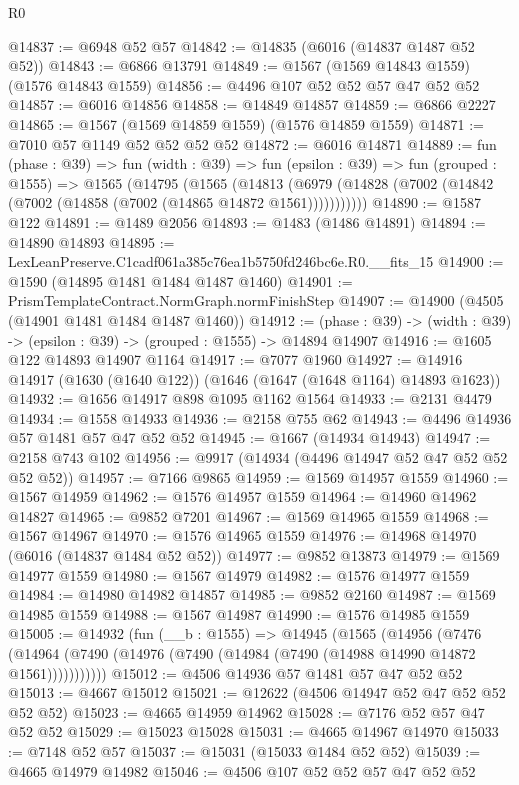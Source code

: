 \begin{lexlean}{R0}
\begin{coremodule}
@14837 := @6948 @52 @57
@14842 := @14835 (@6016 (@14837 @1487 @52 @52))
@14843 := @6866 @13791
@14849 := @1567 (@1569 @14843 @1559) (@1576 @14843 @1559)
@14856 := @4496 @107 @52 @52 @57 @47 @52 @52
@14857 := @6016 @14856
@14858 := @14849 @14857
@14859 := @6866 @2227
@14865 := @1567 (@1569 @14859 @1559) (@1576 @14859 @1559)
@14871 := @7010 @57 @1149 @52 @52 @52 @52
@14872 := @6016 @14871
@14889 := fun (phase : @39) =>
  fun (width : @39) =>
  fun (epsilon : @39) =>
  fun (grouped : @1555) =>
  @1565
    (@14795
      (@1565
        (@14813 (@6979 (@14828 (@7002 (@14842 (@7002 (@14858 (@7002 (@14865 @14872 @1561)))))))))))
@14890 := @1587 @122
@14891 := @1489 @2056
@14893 := @1483 (@1486 @14891)
@14894 := @14890 @14893
@14895 := LexLeanPreserve.C1cadf061a385c76ea1b5750fd246bc6e.R0.__fits_15
@14900 := @1590 (@14895 @1481 @1484 @1487 @1460)
@14901 := PrismTemplateContract.NormGraph.normFinishStep
@14907 := @14900 (@4505 (@14901 @1481 @1484 @1487 @1460))
@14912 := (phase : @39) -> (width : @39) -> (epsilon : @39) -> (grouped : @1555) -> @14894 @14907
@14916 := @1605 @122 @14893 @14907 @1164
@14917 := @7077 @1960
@14927 := @14916 @14917 (@1630 (@1640 @122)) (@1646 (@1647 (@1648 @1164) @14893 @1623))
@14932 := @1656 @14917 @898 @1095 @1162 @1564
@14933 := @2131 @4479
@14934 := @1558 @14933
@14936 := @2158 @755 @62
@14943 := @4496 @14936 @57 @1481 @57 @47 @52 @52
@14945 := @1667 (@14934 @14943)
@14947 := @2158 @743 @102
@14956 := @9917 (@14934 (@4496 @14947 @52 @47 @52 @52 @52 @52))
@14957 := @7166 @9865
@14959 := @1569 @14957 @1559
@14960 := @1567 @14959
@14962 := @1576 @14957 @1559
@14964 := @14960 @14962 @14827
@14965 := @9852 @7201
@14967 := @1569 @14965 @1559
@14968 := @1567 @14967
@14970 := @1576 @14965 @1559
@14976 := @14968 @14970 (@6016 (@14837 @1484 @52 @52))
@14977 := @9852 @13873
@14979 := @1569 @14977 @1559
@14980 := @1567 @14979
@14982 := @1576 @14977 @1559
@14984 := @14980 @14982 @14857
@14985 := @9852 @2160
@14987 := @1569 @14985 @1559
@14988 := @1567 @14987
@14990 := @1576 @14985 @1559
@15005 := @14932
    (fun (__b : @1555) =>
    @14945
      (@1565
        (@14956
          (@7476 (@14964 (@7490 (@14976 (@7490 (@14984 (@7490 (@14988 @14990 @14872 @1561)))))))))))
@15012 := @4506 @14936 @57 @1481 @57 @47 @52 @52
@15013 := @4667 @15012
@15021 := @12622 (@4506 @14947 @52 @47 @52 @52 @52 @52)
@15023 := @4665 @14959 @14962
@15028 := @7176 @52 @57 @47 @52 @52
@15029 := @15023 @15028
@15031 := @4665 @14967 @14970
@15033 := @7148 @52 @57
@15037 := @15031 (@15033 @1484 @52 @52)
@15039 := @4665 @14979 @14982
@15046 := @4506 @107 @52 @52 @57 @47 @52 @52

\end{coremodule}
\end{lexlean}
